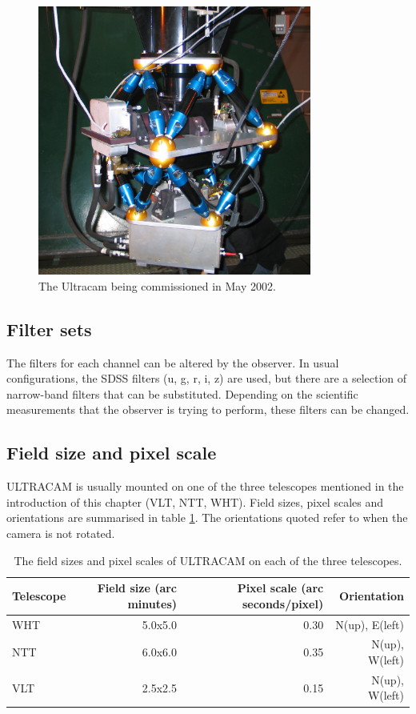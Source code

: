 \begin{figure}[!h]
\centering
\includegraphics[width=90mm]{images/IMG_0121_scaled.JPG}
\caption{The Ultracam being commissioned in May 2002.}
\label{fig1}
\end{figure}

\subsection{Filter sets}
The filters for each channel can be altered by the observer. In usual configurations, the SDSS filters (u, g, r, i, z) are used, but there are a selection of narrow-band filters that can be substituted. Depending on the scientific measurements that the observer is trying to perform, these filters can be changed.   

\subsection{Field size and pixel scale}
ULTRACAM is usually mounted on one of the three telescopes mentioned in the introduction of this chapter (VLT, NTT, WHT). Field sizes, pixel scales and orientations are summarised in table \ref{tab:pixelscale}. The orientations quoted refer to when the camera is not rotated. 

\begin{center}
\begin{table}
	\begin{tabular}{|l|r|r|r|}
    	\hline
		Telescope & Field size (arc minutes) & Pixel scale (arc seconds/pixel) & Orientation \\
		\hline
		WHT & 5.0x5.0 & 0.30 & N(up), E(left)\\
		NTT & 6.0x6.0 & 0.35 & N(up), W(left)\\
		VLT & 2.5x2.5 & 0.15 & N(up), W(left)\\
		\hline
	\end{tabular}
	\caption{The field sizes and pixel scales of ULTRACAM on each of the three telescopes.}
	\label{tab:pixelscale}
\end{table}
\end{center}

